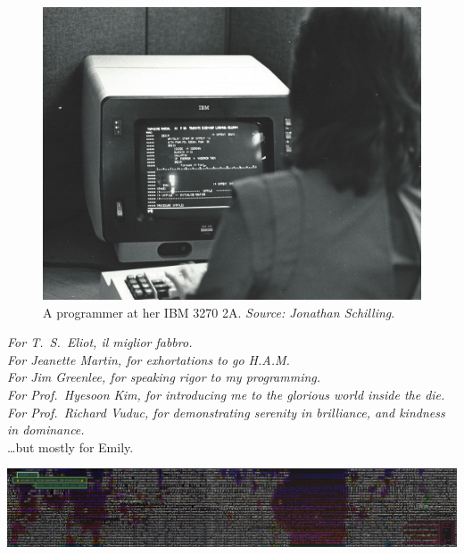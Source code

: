 \documentclass[letterpaper,10pt]{article}
\begin{document}
\vspace*{1.25in}
\begin{figure}[!htbp]
\centering
\includegraphics[width=1\linewidth]{media/ibm3270.jpg}
\caption[A programmer at her IBM 3270]{A programmer at her IBM 3270 2A. \textit{Source: Jonathan Schilling}.}
\end{figure}
\clearpage
\vspace*{1in}
\begin{center}
  \textit{For T.\ S.\ Eliot, il miglior fabbro.} \\
  \vspace{.25in}
  \textit{For Jeanette Martin, for exhortations to go H.A.M. \\
  \vspace{.25in}
  For Jim Greenlee, for speaking rigor to my programming.\\
  \vspace{.25in}
    For Prof.\ Hyesoon Kim, for introducing me to the glorious world
    inside the die.\\
  \vspace{.25in}
    For Prof.\ Richard Vuduc, for demonstrating serenity in brilliance, and kindness in dominance.\\}
  \vspace{1in}\ldots but mostly for Emily.
\end{center}
\clearpage

\tableofcontents
\vfill
\begin{center}
\includegraphics[width=1\linewidth]{media/widechars.png}
\end{center}
\end{document}
